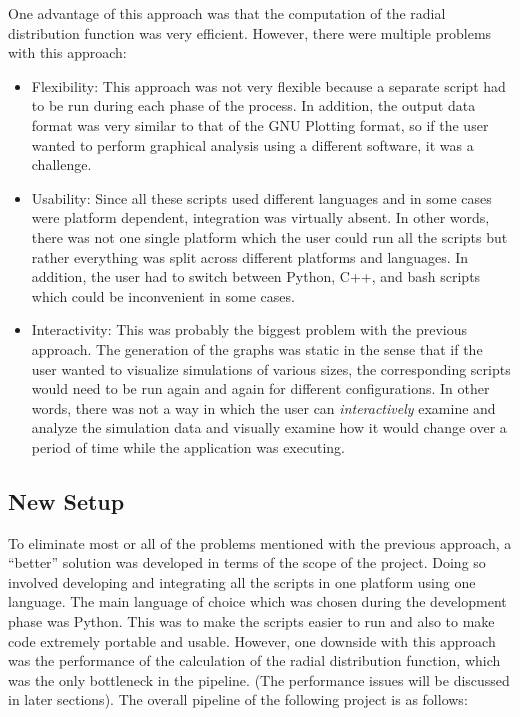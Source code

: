 One advantage of this approach was that the computation of the radial distribution function was very efficient. However, there were multiple problems with this approach:

\begin{itemize}
    \item Flexibility: This approach was not very flexible because a separate script had to be run during each phase of the process. In addition, the output data format was very similar to that of the GNU Plotting format, so if the user wanted to perform graphical analysis using a different software, it was a challenge.
    
    \item Usability: Since all these scripts used different languages and in some cases were platform dependent, integration was virtually absent. In other words, there was not one single platform which the user could run all the scripts but rather everything was split across different platforms and languages. In addition, the user had to switch between Python, C++, and bash scripts which could be inconvenient in some cases. 
    
    \item Interactivity: This was probably the biggest problem with the previous approach. The generation of the graphs was static in the sense that if the user wanted to visualize simulations of various sizes, the corresponding scripts would need to be run again and again for different configurations. In other words, there was not a way in which the user can \textit{interactively} examine and analyze the simulation data and visually examine how it would change over a period of time while the application was executing.
\end{itemize}

\subsection*{New Setup}
To eliminate most or all of the problems mentioned with the previous approach, a ``better'' solution was developed in terms of the scope of the project. Doing so involved developing and integrating all the scripts in one platform using one language. The main language of choice which was chosen during the development phase was Python. This was to make the scripts easier to run and also to make code extremely portable and usable. However, one downside with this approach was the performance of the calculation of the radial distribution function, which was the only bottleneck in the pipeline. (The performance issues will be discussed in later sections). The overall pipeline of the following project is as follows:

